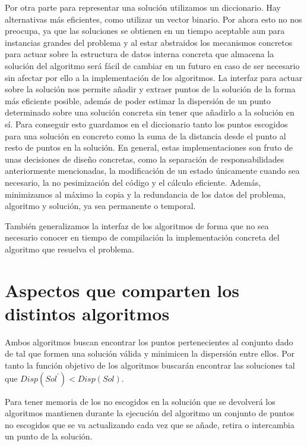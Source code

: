 Por otra parte para representar una solución utilizamos un diccionario. Hay alternativas más eficientes, como utilizar un vector binario. Por ahora
esto no nos preocupa, ya que las soluciones se obtienen en un tiempo aceptable aun para instancias grandes del problema y al estar abstraidos los mecanismos concretos
para actuar sobre la estructura de datos interna concreta que almacena la solución del algoritmo será fácil de cambiar en un futuro en caso de ser necesario sin
afectar por ello a la implementación de los algoritmos. La interfaz para actuar sobre la solución nos permite añadir y extraer puntos de la solución
de la forma más eficiente posible, además de poder estimar la dispersión de un punto determinado sobre una solución concreta sin tener que añadirlo a
la solución en sí. Para conseguir esto guardamos en el diccionario tanto los puntos escogidos para una solución en concreto como la suma de la distancia desde el punto
al resto de puntos en la solución. En general, estas implementaciones son fruto de unas decisiones de diseño concretas, como la separación de responsabilidades anteriormente
mencionadas, la modificación de un estado únicamente cuando sea necesario, la no pesimización del código y el cálculo eficiente. Además, minimizamos al máximo la copia y la redundancia
de los datos del problema, algoritmo y solución, ya sea permanente o temporal.

También generalizamos la interfaz de los algoritmos de forma que no sea necesario conocer en tiempo de compilación la implementación concreta del algoritmo que resuelva el problema.

\section{Aspectos que comparten los distintos algoritmos}

Ambos algoritmos buscan encontrar los puntos pertenecientes al conjunto dado de tal que formen una solución válida y minimicen la dispersión entre ellos. Por tanto la función objetivo de los algoritmos buscarán encontrar las soluciones tal que $ Disp(Sol^{\prime}) < Disp(Sol) $.

Para tener memoria de los no escogidos en la solución que se devolverá los algoritmos mantienen durante la ejecución del algoritmo un conjunto de puntos no escogidos que se va actualizando cada vez que se añade, retira o intercambia un punto de la solución.